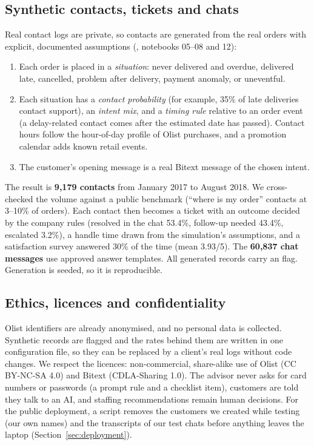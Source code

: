 \subsection{Synthetic contacts, tickets and chats}
\label{sec:synthetic}
Real contact logs are private, so contacts are generated from the real orders with explicit, documented
assumptions (, notebooks 05--08 and 12):
\begin{enumerate}
  \item Each order is placed in a \emph{situation}: never delivered and overdue, delivered late, cancelled,
        problem after delivery, payment anomaly, or uneventful.
  \item Each situation has a \emph{contact probability} (for example, 35\% of late deliveries contact
        support), an \emph{intent mix}, and a \emph{timing rule} relative to an order event (a delay-related
        contact comes after the estimated date has passed). Contact hours follow the hour-of-day profile of
        Olist purchases, and a promotion calendar adds known retail events.
  \item The customer's opening message is a real Bitext message of the chosen intent.
\end{enumerate}
The result is \textbf{9,179 contacts} from January 2017 to August 2018. We cross-checked the volume against a
public benchmark (``where is my order'' contacts at 3--10\% of orders). Each contact then becomes a ticket with
an outcome decided by the company rules (resolved in the chat 53.4\%, follow-up needed 43.4\%, escalated
3.2\%), a handle time drawn from the simulation's assumptions, and a satisfaction survey answered 30\% of the
time (mean 3.93/5). The \textbf{60,837 chat messages} use approved answer templates. All generated records carry
an  flag. Generation is seeded, so it is reproducible.

\subsection{Ethics, licences and confidentiality}
Olist identifiers are already anonymised, and no personal data is collected. Synthetic records are flagged
and the rates behind them are written in one configuration file, so they can be replaced by a client's real
logs without code changes. We respect the licences: non-commercial, share-alike use of Olist (CC BY-NC-SA 4.0)
and Bitext (CDLA-Sharing 1.0). The advisor never asks for card numbers or passwords (a prompt rule and a
checklist item), customers are told they talk to an AI, and staffing recommendations remain human decisions.
For the public deployment, a script removes the customers we created while testing (our own names) and the
transcripts of our test chats before anything leaves the laptop (Section~\ref{sec:deployment}).
